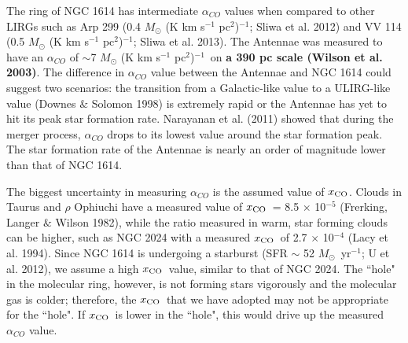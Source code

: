 \documentclass[preprint, 11pt]{aastex}
\newcommand{\msol}{$M_{\odot}$}
\newcommand{\alphaco}{$M_{\odot}$ (K km s$^{-1}$ pc$^{2}$)$^{-1}$}
\newcommand{\xh}{$x_{\rm{CO}}$}
\begin{document}
The ring of NGC 1614 has intermediate $\alpha_{CO}$ values when compared to other LIRGs such as Arp 299 (0.4 \alphaco; Sliwa et al. 2012) and VV 114 (0.5 \alphaco; Sliwa et al. 2013). The Antennae was measured to have an $\alpha_{CO}$ of $\sim$7 \alphaco\ on \textbf{a 390 pc scale (Wilson et al. 2003)\nocite{Wilson2003}}. The difference in $\alpha_{CO}$ value between the Antennae and NGC 1614 could suggest two scenarios: the transition from a Galactic-like value to a ULIRG-like value (Downes $\&$ Solomon 1998)\nocite{Downes1998} is extremely rapid or the Antennae has yet to hit its peak star formation rate. Narayanan et al. (2011) showed that during the merger process, $\alpha_{CO}$ drops to its lowest value around the star formation peak. The star formation rate of the Antennae is nearly an order of magnitude lower than that of NGC 1614. 

The biggest uncertainty in measuring $\alpha_{CO}$ is the assumed value of \xh. Clouds in Taurus and $\rho$ Ophiuchi have a measured value of \xh\ = 8.5 $\times$ 10$^{-5}$ (Frerking, Langer $\&$ Wilson 1982)\nocite{Frerking1982}, while the ratio measured in warm, star forming clouds can be higher, such as NGC 2024 with a measured \xh\ of 2.7 $\times$ 10$^{-4}$ (Lacy et al. 1994)\nocite{Lacy1994}. Since NGC 1614 is undergoing a starburst (SFR $\sim$ 52 \msol\ yr$^{-1}$; U et al. 2012)\nocite{U2012}, we assume a high \xh\ value, similar to that of NGC 2024. The ``hole" in the molecular ring, however, is not forming stars vigorously and the molecular gas is colder; therefore, the \xh\ that we have adopted may not be appropriate for the ``hole". If \xh\ is lower in the ``hole", this would drive up the measured $\alpha_{CO}$ value. 
\end{document}
